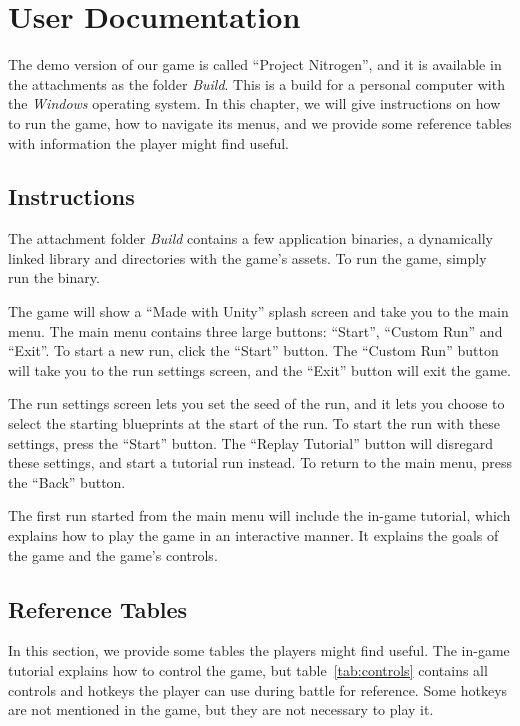 \chapter{User Documentation}

The demo version of our game is called \enquote{Project Nitrogen}, and it is available in the attachments as the folder \emph{Build}.
This is a build for a personal computer with the \emph{Windows} operating system.
In this chapter, we will give instructions on how to run the game, how to navigate its menus, and we provide some reference tables with information the player might find useful.

\section{Instructions}

The attachment folder \emph{Build} contains a few application binaries, a dynamically linked library and directories with the game's assets.
To run the game, simply run the  binary.

The game will show a \enquote{Made with Unity} splash screen and take you to the main menu.
The main menu contains three large buttons: \enquote{Start}, \enquote{Custom Run} and  \enquote{Exit}.
To start a new run, click the \enquote{Start} button.
The \enquote{Custom Run} button will take you to the run settings screen, and the \enquote{Exit} button will exit the game.

The run settings screen lets you set the seed of the run, and it lets you choose to select the starting blueprints at the start of the run.
To start the run with these settings, press the \enquote{Start} button.
The \enquote{Replay Tutorial} button will disregard these settings, and start a tutorial run instead.
To return to the main menu, press the \enquote{Back} button.

The first run started from the main menu will include the in-game tutorial, which explains how to play the game in an interactive manner.
It explains the goals of the game and the game's controls.

\section{Reference Tables}

In this section, we provide some tables the players might find useful.
The in-game tutorial explains how to control the game, but table~\ref{tab:controls} contains all controls and hotkeys the player can use during battle for reference.
Some hotkeys are not mentioned in the game, but they are not necessary to play it.

